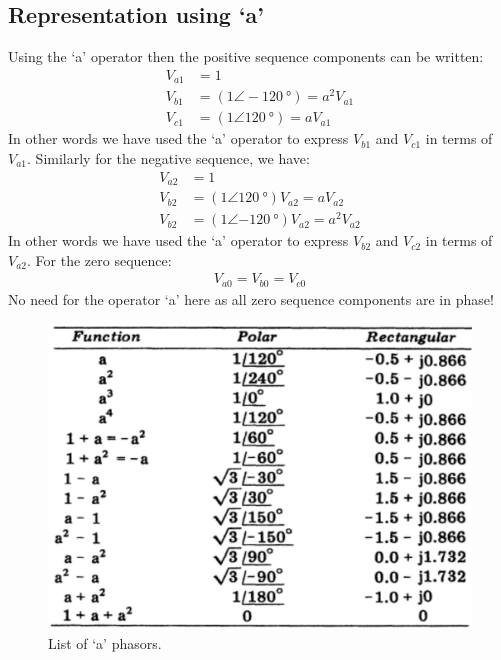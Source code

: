 \subsection{Representation using `a'}
Using the `a' operator then the positive sequence components can be written:
\begin{align}
	V_{a1} & = 1                                                     \\
	V_{b1} & = \left(1 \angle -\SI{120}{\degree}\right) = a^2 V_{a1} \\
	V_{c1} & = \left(1 \angle \SI{120}{\degree}\right) = a V_{a1}
\end{align}
In other words we have used the `a' operator to express $V_{b1}$ and $V_{c1}$ in terms of $V_{a1}$. Similarly for the negative sequence, we have:
\begin{align}
	V_{a2} & = 1                                                          \\
	V_{b2} & = \left(1 \angle \SI{120}{\degree}\right)V_{a2} = aV_{a2}    \\
	V_{b2} & = \left(1 \angle \SI{-120}{\degree}\right)V_{a2} = a^2V_{a2}
\end{align}
In other words we have used the `a' operator to express $V_{b2}$ and $V_{c2}$ in terms of $V_{a2}$. For the zero sequence:
\begin{gather}
	V_{a0} = V_{b0} = V_{c0}
\end{gather}
No need for the operator `a' here as all zero sequence components are in phase!
\begin{figure}[H]
	\centering
	\includegraphics[width = \textwidth]{./img/figure29.png}
	\caption{List of `a' phasors.}
\end{figure}
